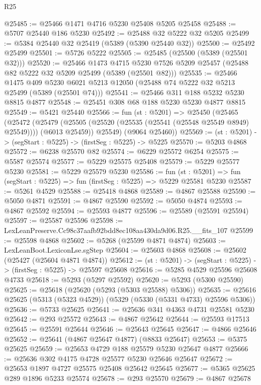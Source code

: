 \begin{lexlean}{R25}
\begin{coremodule}
@25485 := @25466 @1471 @4716 @5230 @25408 @5205 @25458
@25488 := @5707 @25440 @186 @5230
@25492 := @25488 @32 @5222 @32 @5205
@25499 := @5384 @25440 @32 @25419 (@5389 (@5390 @25440 @32))
@25500 := @25492 @25499
@25501 := @5726 @5222
@25505 := @25485 (@25500 (@5389 (@25501 @32)))
@25520 := @25466
    @1473
    @4715
    @5230
    @7526
    @5209
    @25457
    (@25488 @82 @5222 @32 @5209 @25499 (@5389 (@25501 @82)))
@25535 := @25466
    @1475
    @409
    @5230
    @6021
    @5213
    @12050
    (@25488 @74 @5222 @32 @5213 @25499 (@5389 (@25501 @74)))
@25541 := @25466 @311 @188 @5232 @5230 @8815 @4877
@25548 := @25451 @308 @68 @188 @5230 @5230 @4877 @8815
@25549 := @5421 @25440
@25566 := fun (st : @5201) =>
  @25450
    (@25465
      (@25472
        (@25479 (@25505 (@25520 (@25535 (@25541 (@25548 @25549 @8949) @25549)))) (@6013 @25459))
        @25549)
      (@9064 @25460))
@25569 := (st : @5201) -> (segStart : @5225) -> (firstSeg : @5225) -> @5225
@25570 := @5203 @4868
@25572 := @6238 @25570 @82
@25574 := @6229 @25572 @6254
@25575 := @5587 @25574
@25577 := @5229 @25575 @25408
@25579 := @5229 @25577 @5230
@25581 := @5229 @25579 @5230
@25586 := fun (st : @5201) => fun (segStart : @5225) => fun (firstSeg : @5225) => @5229 @25581 @5230
@25587 := @5261 @4529
@25588 := @25418 @4868
@25589 := @4867 @25588
@25590 := @5050 @4871
@25591 := @4867 @25590
@25592 := @5050 @4874
@25593 := @4867 @25592
@25594 := @25593 @4877
@25596 := @25589 (@25591 @25594)
@25597 := @25587 @25596
@25598 := LexLeanPreserve.Cc98c37aafb92bdd8ec108aa430da9d06.R25.__fits_107
@25599 := @25598 @4868
@25602 := @5268 (@25599 @4871 @4874)
@25603 := LexLeanBoot.LexiconLse.sgStep
@25604 := @25603 @4868
@25608 := @25602 (@25427 (@25604 @4871 @4874))
@25612 := (st : @5201) -> (segStart : @5225) -> (firstSeg : @5225) -> @25597 @25608
@25616 := @5285 @4529 @25596 @25608 @4733
@25618 := @5293 (@5297 @25592)
@25620 := @5293 (@5300 @25590)
@25625 := @25618 (@25620 (@5293 (@5303 @25588) @5306))
@25635 := @25616 @25625 (@5313 (@5323 @4529)) (@5329 (@5330 (@5331 @4733) @25596 @5306))
@25636 := @5733 @25625
@25641 := @25636 @341 @4363 @4731 @25581 @5230
@25642 := @293 @25572
@25643 := @4867 @25642
@25644 := @25593 @17513
@25645 := @25591 @25644
@25646 := @25643 @25645
@25647 := @4866 @25646
@25652 := @25641 (@4867 @25647 @4877) (@8833 @25647)
@25653 := @5375 @25625
@25659 := @25653 @4729 @188 @25579 @5230 @25647 @4877
@25666 := @25636 @302 @4175 @4728 @25577 @5230 @25646 @25647
@25672 := @25653 @1897 @4727 @25575 @25408 @25642 @25645
@25677 := @5365 @25625 @289 @1896 @5233 @25574
@25678 := @293 @25570
@25679 := @4867 @25678

\end{coremodule}
\end{lexlean}
